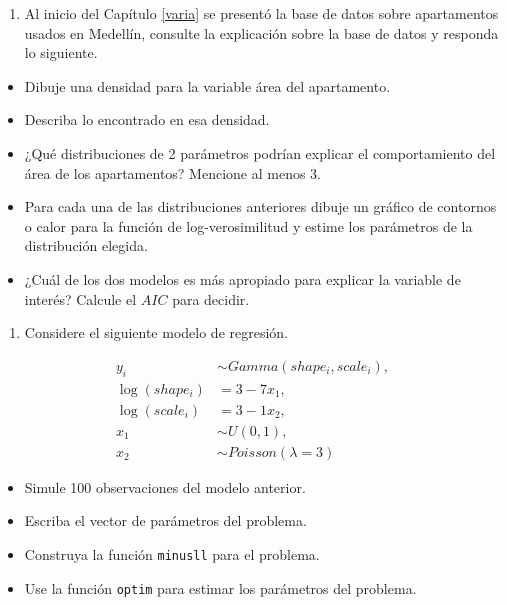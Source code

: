 \documentclass[
]{book}
\providecommand{\tightlist}{%
  \setlength{\itemsep}{0pt}\setlength{\parskip}{0pt}}
\begin{document}
\begin{enumerate}
\def\labelenumi{\arabic{enumi})}
\setcounter{enumi}{2}
\tightlist
\item
  Al inicio del Capítulo \ref{varia} se presentó la base de datos sobre apartamentos usados en Medellín, consulte la explicación sobre la base de datos y responda lo siguiente.
\end{enumerate}

\begin{itemize}
\tightlist
\item
  Dibuje una densidad para la variable área del apartamento.
\item
  Describa lo encontrado en esa densidad.
\item
  ¿Qué distribuciones de 2 parámetros podrían explicar el comportamiento del área de los apartamentos? Mencione al menos 3.
\item
  Para cada una de las distribuciones anteriores dibuje un gráfico de contornos o calor para la función de log-verosimilitud y estime los parámetros de la distribución elegida.
\item
  ¿Cuál de los dos modelos es más apropiado para explicar la variable de interés? Calcule el \(AIC\) para decidir.
\end{itemize}

\begin{enumerate}
\def\labelenumi{\arabic{enumi})}
\setcounter{enumi}{3}
\tightlist
\item
  Considere el siguiente modelo de regresión.
\end{enumerate}

\begin{align*}
y_i &\sim Gamma(shape_i, scale_i), \\
\log(shape_i) &= 3 - 7 x_1, \\
\log(scale_i) &= 3 - 1 x_2, \\
x_1 &\sim U(0, 1), \\
x_2 &\sim Poisson(\lambda=3)
\end{align*}

\begin{itemize}
\tightlist
\item
  Simule 100 observaciones del modelo anterior.
\item
  Escriba el vector de parámetros del problema.
\item
  Construya la función \texttt{minusll} para el problema.
\item
  Use la función \texttt{optim} para estimar los parámetros del problema.
\end{itemize}
\end{document}
